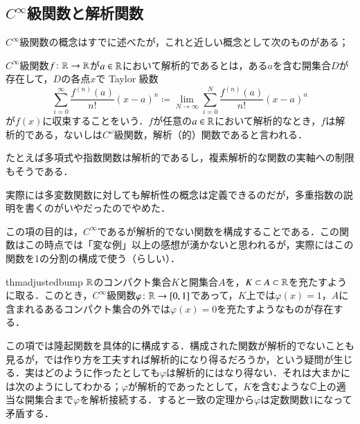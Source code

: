 \subsection{$C^\infty$級関数と解析関数}

$C^\infty$級関数の概念はすでに述べたが，これと近しい概念として次のものがある；

\begin{defi}
$C^\infty$級関数$f \colon \mathbb{R} \to \mathbb{R}$が$a \in \mathbb{R}$において解析的であるとは，ある$a$を含む開集合$D$が存在して，$D$の各点$x$で Taylor 級数
\begin{equation}
\sum_{i=0}^\infty \frac{f^{(n)}(a)}{n!} (x-a)^n \coloneqq \lim_{N \to \infty} \sum_{i=0}^N \frac{f^{(n)}(a)}{n!} (x-a)^n 
\end{equation}が$f(x)$に収束することをいう．$f$が任意の$a \in \mathbb{R}$において解析的なとき，$f$は解析的である，ないしは$C^\omega$級関数，解析（的）関数であると言われる．
\end{defi}

\begin{que}
たとえば多項式や指数関数は解析的であるし，複素解析的な関数の実軸への制限もそうである．
\end{que}

\begin{que}
実際には多変数関数に対しても解析性の概念は定義できるのだが，多重指数の説明を書くのがいやだったのでやめた．
\end{que}

この項の目的は，$C^\infty$であるが解析的でない関数を構成することである．この関数はこの時点では「変な例」以上の感想が湧かないと思われるが，実際にはこの関数を1の分割の構成で使う（らしい）．

\begin{restatable}[隆起関数の存在]{thm}{adjustedbump}\label{隆起関数の存在}
$\mathbb{R}$のコンパクト集合$K$と開集合$A$を，$K \subset A \subset \mathbb{R}$を充たすように取る．このとき，$C^\infty$級関数$\varphi \colon \mathbb{R} \to [0,1]$であって，$K$上では$\varphi(x) = 1$，$A$に含まれるあるコンパクト集合の外では$\varphi(x) = 0$を充たすようなものが存在する．
\end{restatable}

\begin{que}[*]
この項では隆起関数を具体的に構成する．構成された関数が解析的でないことも見るが，では作り方を工夫すれば解析的になり得るだろうか，という疑問が生じる．実はどのように作ったとしても$\varphi$は解析的にはなり得ない．それは大まかには次のようにしてわかる；$\varphi$が解析的であったとして，$K$を含むような$\mathbb{C}$上の適当な開集合まで$\varphi$を解析接続する．すると一致の定理から$\varphi$は定数関数1になって矛盾する．
\end{que}

